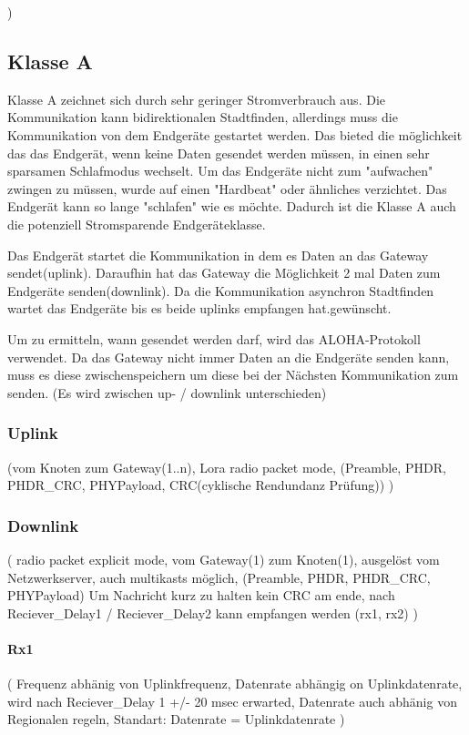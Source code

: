 \documentclass[a4paper,12pt]{article}
\begin{document}
)
        \subsection{Klasse A}
    Klasse A zeichnet sich durch sehr geringer Stromverbrauch aus. Die Kommunikation kann bidirektionalen Stadtfinden, allerdings muss die Kommunikation von dem Endgeräte gestartet werden. Das bieted die möglichkeit das das Endgerät, wenn keine Daten gesendet werden müssen, in einen sehr
    sparsamen Schlafmodus wechselt. Um das Endgeräte nicht zum "aufwachen" zwingen zu müssen, wurde auf einen "Hardbeat" oder ähnliches verzichtet. Das Endgerät kann so lange "schlafen" wie es möchte. Dadurch ist die Klasse A auch die potenziell Stromsparende Endgeräteklasse.
    
    Das Endgerät startet die Kommunikation in dem es Daten an das Gateway sendet(uplink). Daraufhin hat das Gateway die Möglichkeit 2 mal Daten zum Endgeräte senden(downlink). Da die Kommunikation asynchron Stadtfinden wartet das Endgeräte bis es beide uplinks empfangen hat.gewünscht.
    
    Um zu ermitteln, wann gesendet werden darf, wird das ALOHA-Protokoll verwendet.
    Da das Gateway nicht immer Daten an die Endgeräte senden kann, muss es diese zwischenspeichern um diese bei der Nächsten Kommunikation zum senden.
    \cite{LoRaSpec}(Es wird zwischen up- / downlink unterschieden)

    \subsubsection{Uplink}

    \cite{LoRaSpec} 
    (vom Knoten zum Gateway(1..n), Lora radio packet mode, (Preamble, PHDR, PHDR\_CRC, PHYPayload, CRC(cyklische Rendundanz Prüfung))
        )

    \subsubsection{Downlink}

    \cite{LoRaSpec}
    (
        radio packet explicit mode, vom Gateway(1) zum Knoten(1), ausgelöst vom Netzwerkserver, auch multikasts möglich, (Preamble, PHDR, PHDR\_CRC, PHYPayload)
    Um Nachricht kurz zu halten kein CRC am ende, nach Reciever\_Delay1 / Reciever\_Delay2 kann empfangen werden (rx1, rx2) 
    )
    \paragraph{Rx1}
    \cite{LoRaSpec}(
        Frequenz abhänig von Uplinkfrequenz, Datenrate abhängig on Uplinkdatenrate, wird nach Reciever\_Delay 1 +/- 20 msec erwarted, Datenrate auch abhänig von Regionalen regeln, Standart: Datenrate = Uplinkdatenrate
    )
\end{document}
